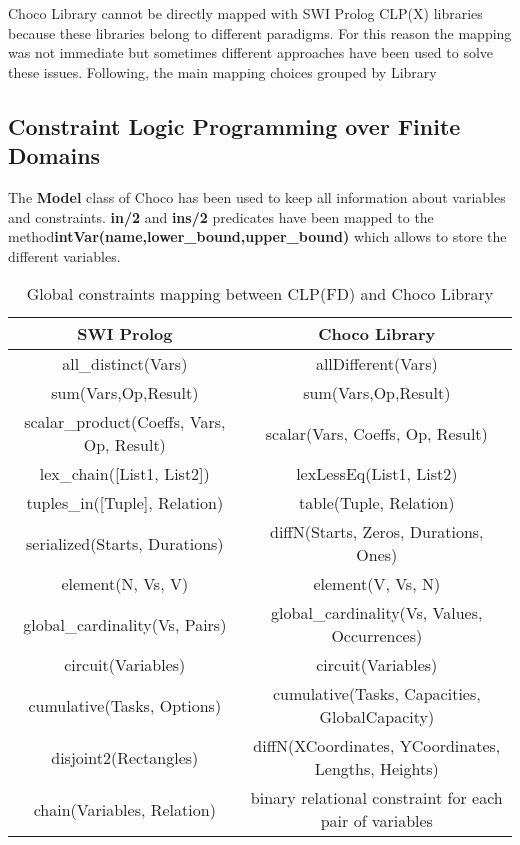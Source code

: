 Choco Library cannot be directly mapped with SWI Prolog CLP(X) libraries
because these libraries belong to different paradigms. For this reason the mapping was not immediate but
sometimes different approaches have been used to solve these issues.\newline\newline
Following, the main mapping choices grouped by Library

\subsection{Constraint Logic Programming over Finite Domains}\label{subsec:map_clpfd}

The \textbf{Model} class of Choco has been used to keep all information about variables and constraints.\newline
\textbf{in/2} and \textbf{ins/2} predicates have been mapped to the method\newline\textbf{intVar(name,lower\_bound,upper\_bound)}
which allows to store the different variables.\newline
\begin{center}
    \begin{table}
        \begin{tabular}{||c c||} 
        \hline
        SWI Prolog & Choco Library \\ [0.5ex] 
        \hline\hline
        all\_distinct(Vars) & allDifferent(Vars) \\ 
        \hline
        sum(Vars,Op,Result) & sum(Vars,Op,Result) \\
        \hline
        scalar\_product(Coeffs, Vars, Op, Result) & scalar(Vars, Coeffs, Op, Result)\\
        \hline
        lex\_chain([List1, List2]) & lexLessEq(List1, List2) \\
        \hline
        tuples\_in([Tuple], Relation) & table(Tuple, Relation) \\
        \hline
        serialized(Starts, Durations) & diffN(Starts, Zeros, Durations, Ones) \\
        \hline
        element(N, Vs, V) & element(V, Vs, N) \\
        \hline
        global\_cardinality(Vs, Pairs) & global\_cardinality(Vs, Values, Occurrences) \\
        \hline
        circuit(Variables) & circuit(Variables) \\
        \hline
        cumulative(Tasks, Options) & cumulative(Tasks, Capacities, GlobalCapacity) \\
        \hline
        disjoint2(Rectangles) & diffN(XCoordinates, YCoordinates, Lengths, Heights) \\
        \hline
        chain(Variables, Relation) & binary relational constraint for each pair of variables \\
        \hline
        \end{tabular}
        \label{table:global_mapping}
        \caption{Global constraints mapping between CLP(FD) and Choco Library}
    \end{table}    
\end{center}
